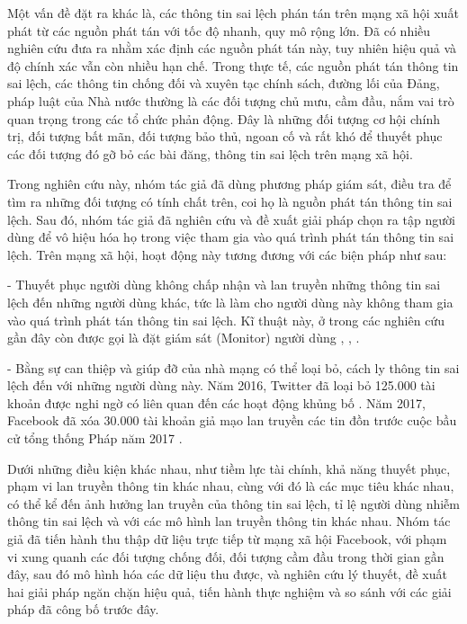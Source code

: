 Một vấn đề đặt ra khác là, các thông tin sai lệch phán tán trên mạng xã hội xuất phát từ các nguồn phát tán với tốc độ nhanh, quy mô rộng lớn. Đã có nhiều nghiên cứu đưa ra nhằm xác định các nguồn phát tán này, tuy nhiên hiệu quả và độ chính xác vẫn còn nhiều hạn chế. Trong thực tế, các nguồn phát tán thông tin sai lệch, các thông tin chống đối và xuyên tạc chính sách, đường lối của Đảng, pháp luật của Nhà nước thường là các đối tượng chủ mưu, cầm đầu, nắm vai trò quan trọng trong các tổ chức phản động. Đây là những đối tượng cơ hội chính trị, đối tượng bất mãn, đối tượng bảo thủ, ngoan cố và rất khó để thuyết phục các đối tượng đó gỡ bỏ các bài đăng, thông tin sai lệch trên mạng xã hội.

Trong nghiên cứu này, nhóm tác giả đã dùng phương pháp giám sát, điều tra để tìm ra những đối tượng có tính chất trên, coi họ là nguồn phát tán thông tin sai lệch. Sau đó, nhóm tác giả đã nghiên cứu và đề xuất giải pháp chọn ra tập người dùng để vô hiệu hóa họ trong việc tham gia vào quá trình phát tán thông tin sai lệch. Trên mạng xã hội, hoạt động này tương đương với các biện pháp như sau:

- Thuyết phục người dùng không chấp nhận và lan truyền những thông tin sai lệch đến những người dùng khác, tức là làm cho người dùng này không tham gia vào quá trình phát tán thông tin sai lệch. Kĩ thuật này, ở trong các nghiên cứu gần đây còn được gọi là đặt giám sát (Monitor) người dùng \cite{zhang32}, \cite{zhang33}, \cite{zhang34}.

- Bằng sự can thiệp và giúp đỡ của nhà mạng có thể loại bỏ, cách ly thông tin sai lệch đến với những người dùng này. Năm 2016, Twitter đã loại bỏ 125.000 tài khoản được nghi ngờ có liên quan đến các hoạt động khủng bố \cite{twitter}. Năm 2017, Facebook đã xóa 30.000 tài khoản giả mạo lan truyền các tin đồn trước cuộc bầu cử tổng thống Pháp năm 2017 \cite{french}.

Dưới những điều kiện khác nhau, như tiềm lực tài chính, khả năng thuyết phục, phạm vi lan truyền thông tin khác nhau, cùng với đó là các mục tiêu khác nhau, có thể kể đến ảnh hưởng lan truyền của thông tin sai lệch, tỉ lệ người dùng nhiễm thông tin sai lệch và với các mô hình lan truyền thông tin khác nhau. Nhóm tác giả đã tiến hành thu thập dữ liệu trực tiếp từ mạng xã hội Facebook, với phạm vi xung quanh các đối tượng chống đối, đối tượng cầm đầu trong thời gian gần đây, sau đó mô hình hóa các dữ liệu thu được, và nghiên cứu lý thuyết, đề xuất hai giải pháp ngăn chặn hiệu quả, tiến hành thực nghiệm và so sánh với các giải pháp đã công bố trước đây. 

